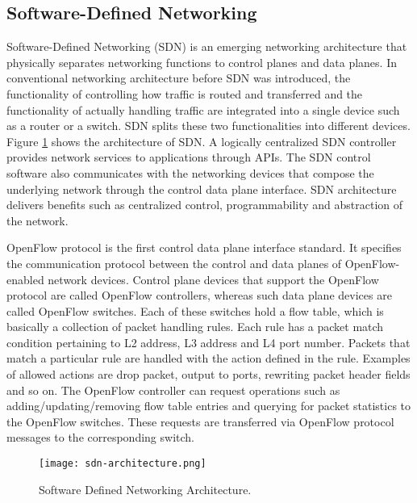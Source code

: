 \hypertarget{software-defined-networking}{%
\subsection{Software-Defined
Networking}\label{software-defined-networking}}

Software-Defined Networking (SDN) \cite{sdn} is an emerging networking
architecture that physically separates networking functions to control
planes and data planes. In conventional networking architecture before
SDN was introduced, the functionality of controlling how traffic is
routed and transferred and the functionality of actually handling
traffic are integrated into a single device such as a router or a
switch. SDN splits these two functionalities into different devices.
Figure \ref{fig-sdn-architecture} shows the architecture of SDN. A
logically centralized SDN controller provides network services to
applications through APIs. The SDN control software also communicates
with the networking devices that compose the underlying network through
the control data plane interface. SDN architecture delivers benefits
such as centralized control, programmability and abstraction of the
network.

OpenFlow \cite{sdn} protocol is the first control data plane interface
standard. It specifies the communication protocol between the control
and data planes of OpenFlow-enabled network devices. Control plane
devices that support the OpenFlow protocol are called OpenFlow
controllers, whereas such data plane devices are called OpenFlow
switches. Each of these switches hold a flow table, which is basically a
collection of packet handling rules. Each rule has a packet match
condition pertaining to L2 address, L3 address and L4 port number.
Packets that match a particular rule are handled with the action defined
in the rule. Examples of allowed actions are drop packet, output to
ports, rewriting packet header fields and so on. The OpenFlow controller
can request operations such as adding/updating/removing flow table
entries and querying for packet statistics to the OpenFlow switches.
These requests are transferred via OpenFlow protocol messages to the
corresponding switch.

\begin{figure}[htbp]
    \centering
    \texttt{[image: sdn-architecture.png]}
    \caption{Software Defined Networking Architecture.}
    \label{fig-sdn-architecture}
\end{figure}


